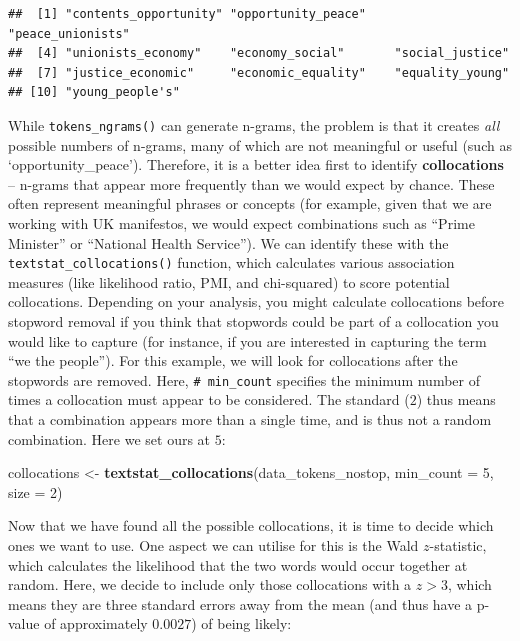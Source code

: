\documentclass[
]{book}
\newenvironment{Shaded}{\begin{snugshade}}{\end{snugshade}}
\newcommand{\AttributeTok}[1]{\textcolor[rgb]{0.13,0.29,0.53}{#1}}
\newcommand{\DecValTok}[1]{\textcolor[rgb]{0.00,0.00,0.81}{#1}}
\newcommand{\FunctionTok}[1]{\textcolor[rgb]{0.13,0.29,0.53}{\textbf{#1}}}
\newcommand{\NormalTok}[1]{#1}
\newcommand{\OtherTok}[1]{\textcolor[rgb]{0.56,0.35,0.01}{#1}}
\begin{document}
\begin{verbatim}
##  [1] "contents_opportunity" "opportunity_peace"    "peace_unionists"     
##  [4] "unionists_economy"    "economy_social"       "social_justice"      
##  [7] "justice_economic"     "economic_equality"    "equality_young"      
## [10] "young_people's"
\end{verbatim}

While \texttt{tokens\_ngrams()} can generate n-grams, the problem is that it creates \emph{all} possible numbers of n-grams, many of which are not meaningful or useful (such as `opportunity\_peace'). Therefore, it is a better idea first to identify \textbf{collocations} -- n-grams that appear more frequently than we would expect by chance. These often represent meaningful phrases or concepts (for example, given that we are working with UK manifestos, we would expect combinations such as ``Prime Minister'' or ``National Health Service''). We can identify these with the \texttt{textstat\_collocations()} function, which calculates various association measures (like likelihood ratio, PMI, and chi-squared) to score potential collocations. Depending on your analysis, you might calculate collocations before stopword removal if you think that stopwords could be part of a collocation you would like to capture (for instance, if you are interested in capturing the term ``we the people''). For this example, we will look for collocations after the stopwords are removed. Here, \texttt{\#\ min\_count} specifies the minimum number of times a collocation must appear to be considered. The standard (\(2\)) thus means that a combination appears more than a single time, and is thus not a random combination. Here we set ours at \(5\):

\begin{Shaded}
\begin{Highlighting}[]
\NormalTok{collocations }\OtherTok{\textless{}{-}} \FunctionTok{textstat\_collocations}\NormalTok{(data\_tokens\_nostop, }\AttributeTok{min\_count =} \DecValTok{5}\NormalTok{, }\AttributeTok{size =} \DecValTok{2}\NormalTok{)}
\end{Highlighting}
\end{Shaded}

Now that we have found all the possible collocations, it is time to decide which ones we want to use. One aspect we can utilise for this is the Wald \(z\)-statistic, which calculates the likelihood that the two words would occur together at random. Here, we decide to include only those collocations with a \(z>3\), which means they are three standard errors away from the mean (and thus have a p-value of approximately \(0.0027\)) of being likely:
\end{document}
